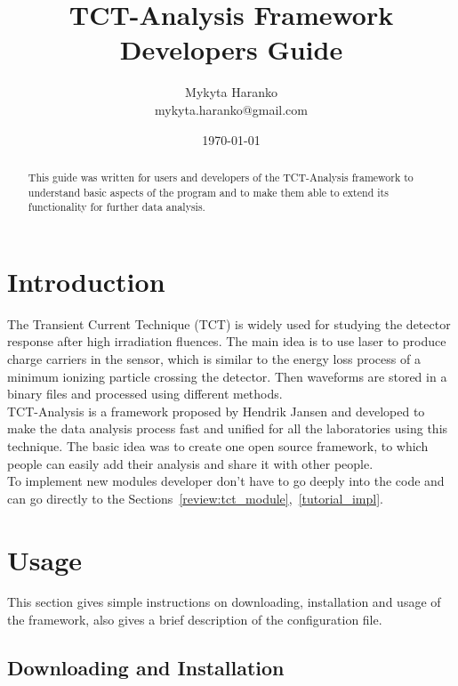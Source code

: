 \documentclass[12pt,oneside,notitlepage,abstracton,a4paper]{scrartcl}
\title{\Large TCT-Analysis Framework Developers Guide}
\author{ Mykyta Haranko \\ \footnotesize mykyta.haranko@gmail.com }
\date{\normalsize \today}
\begin{document}
\maketitle

\begin{abstract}

\noindent
This guide was written for users and developers of the TCT-Analysis framework to understand basic aspects of the program and to make them able to extend its functionality for further data analysis.
\end{abstract}

\newpage
\tableofcontents
\newpage 

\section{Introduction}\label{intro}

The Transient Current Technique (TCT) is widely used for studying the detector response after high irradiation fluences. The main idea is to use laser to produce charge carriers in the sensor, which is similar to the energy loss process of a minimum ionizing particle crossing the detector\cite{bib:haranko_desy}. Then waveforms are stored in a binary files and processed using different methods.
\\ \indent TCT-Analysis is a framework proposed by Hendrik Jansen and developed to make the data analysis process fast and unified for all the laboratories using this technique. The basic idea was to create one open source framework, to which people can easily add their analysis and share it with other people.
\\ \indent To implement new modules developer don't have to go deeply into the code and can go directly to the Sections~\ref{review:tct_module},~\ref{tutorial_impl}.

\section{Usage}\label{usage}

This section gives simple instructions on downloading, installation and usage of the framework, also gives a brief description of the configuration file.

\subsection{Downloading and Installation}\label{usage:installation}
\end{document}
